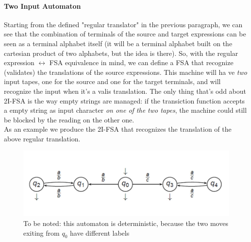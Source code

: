 \documentclass[10pt,a4paper]{article}
\begin{document}
					\paragraph{Two Input Automaton}
						Starting from the defined "regular translator" in the previous paragraph, we can see that the combination of terminals of the source and target expressions can be seen as a terminal alphabet itself (it will be a terminal alphabet built on the cartesian product of two alphabets, but the idea is there). So, with the regular expression $\leftrightarrow$ FSA equivalence in mind, we can define a FSA that recognize (validates) the translations of the source expressions. This machine will ha ve \emph{two} input tapes, one for the source and one for the target terminals, and will recognize the input when it's a valis translation. The only thing that's odd about 2I-FSA is the way empty strings are managed: if the transiction function accepts a empty string as input character \emph{on one of the two tapes}, the machine could still be blocked by the reading on the other one.\\
						As an example we produce the 2I-FSA that recognizes the translation of the above regular translation.
						\begin{figure}[H]
							\centering
							\includegraphics[width = \textwidth]{./images/2IFSA.png}
							\caption{To be noted: this automaton is deterministic, because the two moves exiting from $q_0$ have different labels}
						\end{figure}
						
\end{document}
